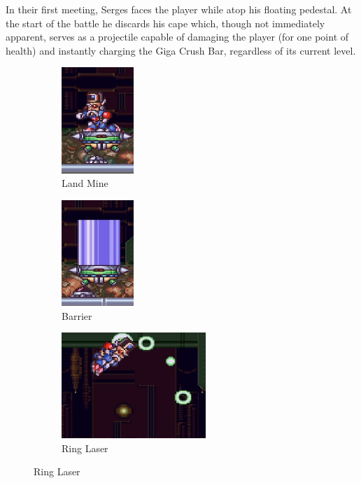 In their first meeting, Serges faces the player while atop his floating pedestal. At the start of the battle he discards his cape which, though not immediately apparent, serves as a projectile capable of damaging the player (for one point of health) and instantly charging the Giga Crush Bar, regardless of its current level.
 \begin{figure}[htp]
	\centering
	\begin{minipage}{.45\linewidth}
		\centering
		\begin{subfigure}[t]{0.49\linewidth}
			\centering
			\includegraphics[height=4cm]{figures/X2/Hunter_stages/Serges_mines.png}
			\caption{Land Mine}	
		\end{subfigure}
		\begin{subfigure}[t]{0.49\linewidth}
			\centering
			\includegraphics[height=4cm]{figures/X2/Hunter_stages/Serges_barrier.png}
			\caption{Barrier}
		\end{subfigure}
		\begin{subfigure}{\linewidth}
			\centering
			\includegraphics[height=4cm]{figures/X2/Hunter_stages/Serges_beams.png}
			\caption{Ring Laser}
		\end{subfigure}
	\end{minipage}
	\begin{minipage}{.35\linewidth}		

\end{minipage}
\end{figure}
